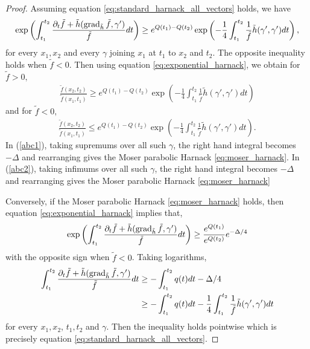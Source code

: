 \begin{proof}
Assuming equation \eqref{eq:standard_harnack_all_vectors} holds, we have
\[
\exp\left(\int_{t_1}^{t_2} \frac{\partial_t \tilde{f} + \tilde{h} (\operatorname{grad}_{\tilde{h}} \tilde{f}, \gamma')}{\tilde{f}} dt\right) \geq e^{Q(t_1) - Q(t_2)} \exp\left(- \frac{1}{4} \int_{t_1}^{t_2} \frac{1}{\tilde{f}} \tilde{h}(\gamma', \gamma') dt\right),
\]
for every $x_1, x_2$ and every $\gamma$ joining $x_1$ at $t_1$ to $x_2$ and $t_2$. The opposite inequality holds when $\tilde{f} < 0$. Then using equation \eqref{eq:exponential_harnack}, we obtain for $\tilde{f}>0,$
\begin{align}\label{abc1}
\frac{\tilde{f} (x_2, t_2)}{\tilde{f} (x_1, t_1)} \geq e^{Q(t_1) - Q(t_2)} \exp\left(- \frac{1}{4} \int_{t_1}^{t_2} \frac{1}{\tilde{f}} \tilde{h}(\gamma', \gamma') dt\right)
\end{align}
and for $\tilde{f}<0,$
\begin{align}\label{abc2}
\frac{\tilde{f} (x_2, t_2)}{\tilde{f} (x_1, t_1)} \leq e^{Q(t_1) - Q(t_2)} \exp\left(- \frac{1}{4} \int_{t_1}^{t_2} \frac{1}{\tilde{f}} \tilde{h}(\gamma', \gamma') dt\right).
\end{align}
In (\ref{abc1}), taking supremums over all such $\gamma$, the right hand integral becomes $-\Delta$ and rearranging gives the Moser parabolic Harnack \eqref{eq:moser_harnack}. In (\ref{abc2}), taking infimums over all such $\gamma$, the right hand integral becomes $-\Delta$ and rearranging gives the Moser parabolic Harnack \eqref{eq:moser_harnack}

Conversely, if the Moser parabolic Harnack \eqref{eq:moser_harnack} holds, then equation \eqref{eq:exponential_harnack} implies that,
\[
\exp \left(\int_{t_1}^{t_2} \frac{\partial_t \tilde{f} + \tilde{h} (\operatorname{grad}_{\tilde{h}} \tilde{f}, \gamma')}{\tilde{f}} dt\right) \geq \frac{e^{Q(t_1)}}{e^{Q(t_2)}} e^{-\Delta/4}
\]
with the opposite sign when $\tilde{f} < 0$. Taking logarithms,
\[
\begin{split}
\int_{t_1}^{t_2} \frac{\partial_t \tilde{f} + \tilde{h} (\operatorname{grad}_{\tilde{h}} \tilde{f}, \gamma')}{\tilde{f}} dt &\geq -\int_{t_1}^{t_2} q(t) dt - \Delta/4 \\
&\geq - \int_{t_1}^{t_2} q(t) dt -  \frac{1}{4} \int_{t_1}^{t_2} \frac{1}{\tilde{f}} \tilde{h}(\gamma', \gamma') dt
\end{split}
\]
for every $x_1, x_2$, $t_1, t_2$ and $\gamma$. Then the inequality holds pointwise which is precisely equation \eqref{eq:standard_harnack_all_vectors}.
\end{proof}

